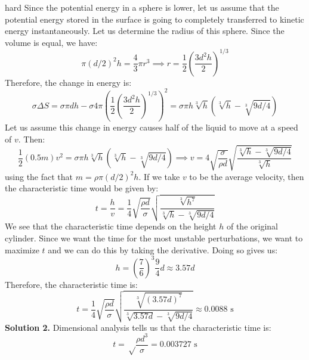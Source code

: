 \begin{solution}{hard}
Since the potential energy in a sphere is lower, let us assume that the potential energy stored in the surface is going to completely transferred to kinetic energy instantaneously. Let us determine the radius of this sphere. Since the volume is equal, we have:
$$\pi(d/2)^2 h = \frac{4}{3}\pi r^3 \implies r = \frac{1}{2}\left(\frac{3d^2h}{2}\right)^{1/3}$$
Therefore, the change in energy is:
$$\sigma\Delta S = \sigma\pi dh - \sigma4\pi \left(\frac{1}{2}\left(\frac{3d^2h}{2}\right)^{1/3}\right)^2 = \sigma\pi h\sqrt[3]h\left(\sqrt[3]h-\sqrt[3]{9d/4}\right)$$
Let us assume this change in energy causes half of the liquid to move at a speed of $v$. Then:
$$\frac{1}{2}(0.5 m)v^2 = \sigma\pi h\sqrt[3]h\left(\sqrt[3]h-\sqrt[3]{9d/4}\right) \implies
v = 4\sqrt{\frac{\sigma}{\rho d}}\sqrt{\frac{\sqrt[3]h-\sqrt[3]{9d/4}}{\sqrt[3]h}}
$$
using the fact that $m=\rho \pi (d/2)^2h$. If we take $v$ to be the average velocity, then the characteristic time would be given by:
$$t=\frac{h}{v}=\frac{1}{4}\sqrt{\frac{\rho d}{\sigma}}\sqrt{\frac{\sqrt[3]{h^7}}{\sqrt[3]h-\sqrt[3]{9d/4}}}$$
We see that the characteristic time depends on the height $h$ of the original cylinder. Since we want the time for the most unstable perturbations, we want to maximize $t$ and we can do this by taking the derivative. Doing so gives us:
$$h=\left(\frac{7}{6}\right)^3\frac{9}{4}d\approx 3.57d$$
Therefore, the characteristic time is:
$$t=\frac{1}{4}\sqrt{\frac{\rho d}{\sigma}}\sqrt{\frac{\sqrt[3]{(3.57d)^7}}{\sqrt[3]{3.57d}-\sqrt[3]{9d/4}}} \approx 0.0088 \text{ s}$$
\tcbline 
\textbf{Solution 2.} Dimensional analysis tells us that the characteristic time is:
$$t =\sqrt \frac{\rho d^3}{\sigma}=0.003727 \text{ s}$$
\end{solution}